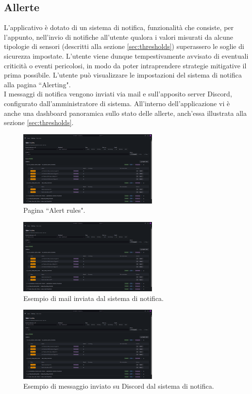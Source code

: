 \documentclass[8pt]{article}
\begin{document}
\subsection{Allerte} \label{sec:alert}
L'applicativo è dotato di un sistema di notifica, funzionalità che consiste, per l'appunto, nell'invio di notifiche all'utente qualora i valori misurati da alcune tipologie di sensori (descritti alla sezione \ref{sec:thresholds}) superassero le soglie di sicurezza impostate. L'utente viene dunque tempestivamente avvisato di eventuali criticità o eventi pericolosi, in modo da poter intraprendere strategie mitigative il prima possibile. L'utente può visualizzare le impostazioni del sistema di notifica alla pagina ``Alerting". \\ I messaggi di notifica vengono inviati via mail e sull'apposito server Discord, configurato dall'amministratore di sistema. All'interno dell'applicazione vi è anche una dashboard panoramica sullo stato delle allerte, anch'essa illustrata alla sezione \ref{sec:thresholds}.
\begin{figure}[H]
    \centering
    \includegraphics[width=7cm]{images_mu/alerting.png}
    \caption{Pagina ``Alert rules".}
    \label{fig:Pagina ``Alert rules"}
\end{figure}
\begin{figure}[H]
    \centering
    \includegraphics[width=7cm]{images_mu/alerting.png}
    \caption{Esempio di mail inviata dal sistema di notifica.}
    \label{fig:Esempio di mail inviata dal sistema di notifica}
\end{figure}
\begin{figure}[H]
    \centering
    \includegraphics[width=7cm]{images_mu/alerting.png}
    \caption{Esempio di messaggio inviato su Discord dal sistema di notifica.}
    \label{fig:Esempio di messaggio inviato su Discord dal sistema di notifica}
\end{figure}
\end{document}
